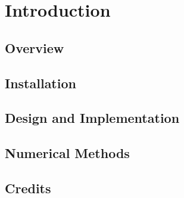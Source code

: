 \documentclass[letterpaper]{book}
\begin{document}
\mainmatter


\part{Introduction}


\parttoc


\chapter{Overview}


  


\chapter{Installation}





\chapter{Design and Implementation}





\chapter{Numerical Methods}





\chapter{Credits}




\end{document}
